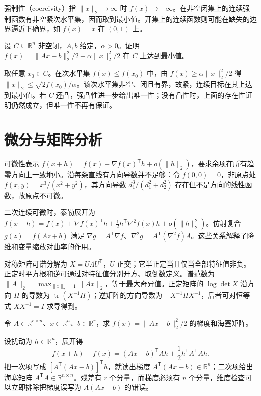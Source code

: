 强制性（coercivity）指 $\|x\|_2\to\infty$ 时 $f(x)\to+\infty$。在非空闭集上的连续强制函数有非空紧次水平集，因而取到最小值。开集上的连续函数则可能在缺失的边界逼近下确界，如 $f(x)=x$ 在 $(0,1)$ 上。

\begin{example}[用次水平集证明最优解存在]
设 $C\subseteq\mathbb R^n$ 非空闭，$A,b$ 给定，$\alpha>0$。证明 $f(x)=\|Ax-b\|_2^2/2+\alpha\|x\|_2^2/2$ 在 $C$ 上达到最小值。
\end{example}
\begin{solve}
取任意 $x_0\in C$。在次水平集 $f(x)\leq f(x_0)$ 中，由 $f(x)\geq\alpha\|x\|_2^2/2$ 得 $\|x\|_2\leq\sqrt{2f(x_0)/\alpha}$。该次水平集非空、闭且有界，故紧，连续目标在其上达到最小值。若 $C$ 还凸，强凸性进一步给出唯一性；没有凸性时，上面的存在性证明仍然成立，但唯一性不再有保证。
\end{solve}

\section{微分与矩阵分析}

可微性表示 $f(x+h)=f(x)+\nabla f(x)^{\mathsf T}h+o(\|h\|_2)$，要求余项在所有趋零方向上一致地小。沿每条直线有方向导数并不足够：令 $f(0,0)=0$，非原点处 $f(x,y)=x^3/(x^2+y^2)$，其方向导数 $d_1^3/(d_1^2+d_2^2)$ 存在但不是方向的线性函数，故原点不可微。

二次连续可微时，泰勒展开为 $f(x+h)=f(x)+\nabla f(x)^{\mathsf T}h+\tfrac12h^{\mathsf T}\nabla^2f(x)h+o(\|h\|_2^2)$。仿射复合 $g(z)=f(Az+b)$ 满足 $\nabla g=A^{\mathsf T}\nabla f$、$\nabla^2g=A^{\mathsf T}(\nabla^2f)A$。这些关系解释了降维和变量缩放对曲率的作用。

对称矩阵可谱分解为 $X=U\Lambda U^{\mathsf T}$，$U$ 正交；它半正定当且仅当全部特征值非负。正定时平方根和逆可通过对特征值分别开方、取倒数定义。谱范数为 $\|A\|_2=\max_{\|x\|_2=1}\|Ax\|_2$，等于最大奇异值。正定矩阵的 $\log\det X$ 沿方向 $H$ 的导数为 $\operatorname{tr}(X^{-1}H)$；逆矩阵的方向导数为 $-X^{-1}HX^{-1}$，后者可对恒等式 $XX^{-1}=I$ 求导得到。

\begin{example}[最小二乘梯度的维度与推导]
令 $A\in\mathbb R^{r\times n}$、$x\in\mathbb R^n$、$b\in\mathbb R^r$，求 $f(x)=\|Ax-b\|_2^2/2$ 的梯度和海塞矩阵。
\end{example}
\begin{solve}
设扰动为 $h\in\mathbb R^n$，展开得
\[
 f(x+h)-f(x)=(Ax-b)^{\mathsf T}Ah+\frac12h^{\mathsf T}A^{\mathsf T}Ah.
\]
把一次项写成 $[A^{\mathsf T}(Ax-b)]^{\mathsf T}h$，就读出梯度 $A^{\mathsf T}(Ax-b)\in\mathbb R^n$；二次项给出海塞矩阵 $A^{\mathsf T}A\in\mathbb R^{n\times n}$。残差有 $r$ 个分量，而梯度必须有 $n$ 个分量，维度检查可以立即排除把梯度误写为 $A(Ax-b)$ 的错误。
\end{solve}

